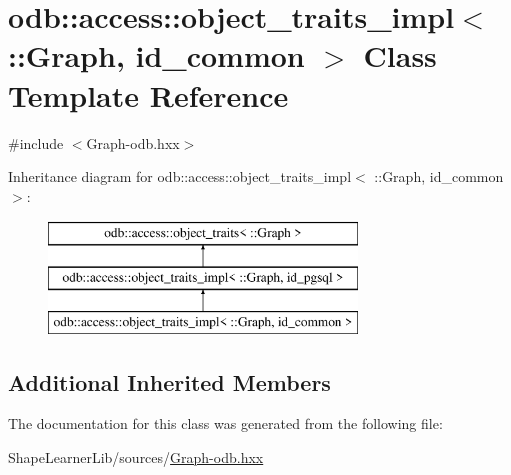 \hypertarget{classodb_1_1access_1_1object__traits__impl_3_01_1_1_graph_00_01id__common_01_4}{}\section{odb\+:\+:access\+:\+:object\+\_\+traits\+\_\+impl$<$ \+:\+:Graph, id\+\_\+common $>$ Class Template Reference}
\label{classodb_1_1access_1_1object__traits__impl_3_01_1_1_graph_00_01id__common_01_4}


{\ttfamily \#include $<$Graph-\/odb.\+hxx$>$}

Inheritance diagram for odb\+:\+:access\+:\+:object\+\_\+traits\+\_\+impl$<$ \+:\+:Graph, id\+\_\+common $>$\+:\begin{figure}[H]
\begin{center}
\leavevmode
\includegraphics[height=3.000000cm]{d7/d3c/classodb_1_1access_1_1object__traits__impl_3_01_1_1_graph_00_01id__common_01_4}
\end{center}
\end{figure}
\subsection*{Additional Inherited Members}


The documentation for this class was generated from the following file\+:\begin{DoxyCompactItemize}
\item 
Shape\+Learner\+Lib/sources/\hyperlink{_graph-odb_8hxx}{Graph-\/odb.\+hxx}\end{DoxyCompactItemize}
